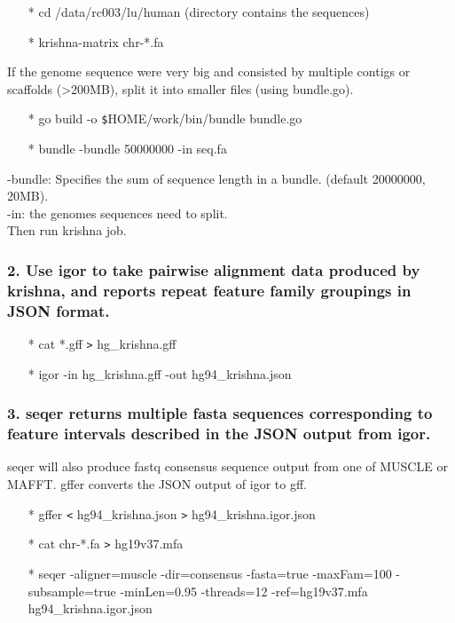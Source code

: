 \documentclass[12pt]{report}
\begin{document}
\begin{enumerate}
	\item[*] cd /data/rc003/lu/human (directory contains the sequences)
	\item[*] krishna-matrix chr-*.fa
\end{enumerate}

\noindent If the genome sequence were very big and consisted by multiple contigs or scaffolds (>200MB), split it into smaller files (using bundle.go).\\

\begin{enumerate}
	\item[*] go build -o \texttt{\$}HOME/work/bin/bundle bundle.go
	\item[*] bundle -bundle 50000000 -in seq.fa
\end{enumerate}

-bundle: Specifies the sum of sequence length in a bundle. (default 20000000, 20MB).\\
-in: the genomes sequences need to split.\\
Then run krishna job.\\

\subsubsection{2. Use igor to take pairwise alignment data produced by krishna, and reports repeat feature family groupings in JSON format.}

\begin{enumerate}
	\item[*] cat *.gff \texttt{>} hg\_krishna.gff
	\item[*] igor -in hg\_krishna.gff -out hg94\_krishna.json
\end{enumerate}

\subsubsection{3. seqer returns multiple fasta sequences corresponding to feature intervals described in the JSON output from igor.}
seqer will also produce fastq consensus sequence output from one of MUSCLE or MAFFT. gffer converts the JSON output of igor to gff.

\begin{enumerate}
	\item[*] gffer \texttt{<} hg94\_krishna.json \texttt{>} hg94\_krishna.igor.json
	\item[*] cat chr-*.fa \texttt{>} hg19v37.mfa
	\item[*] seqer -aligner=muscle -dir=consensus -fasta=true -maxFam=100 -subsample=true -minLen=0.95 -threads=12 -ref=hg19v37.mfa hg94\_krishna.igor.json
\end{enumerate}
\end{document}
